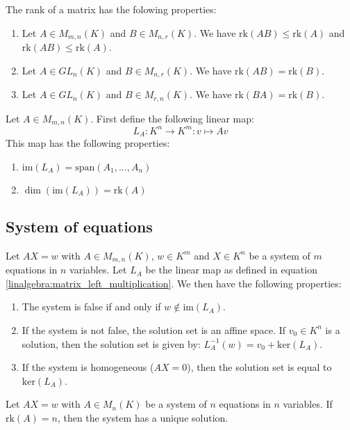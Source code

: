     \begin{property}
		\label{linalgebra:rank_properties}
        The rank of a matrix has the folowing properties:
        \begin{enumerate}
			\item Let $A\in M_{m,n}(K)$ and $B\in M_{n,r}(K)$. We have $\text{rk}(AB)\leq\text{rk}(A)$ and $\text{rk}(AB)\leq\text{rk}(A)$.
            \item Let $A\in GL_n(K)$ and $B\in M_{n,r}(K)$. We have $\text{rk}(AB)=\text{rk}(B)$.
            \item Let $A\in GL_n(K)$ and $B\in M_{r,n}(K)$. We have $\text{rk}(BA)=\text{rk}(B)$.
		\end{enumerate}
	\end{property}
    \begin{property}
		\label{linalgebra:dim_matrix_left_multiplication}
        Let $A\in M_{m,n}(K)$. First define the following linear map:
        \begin{equation}
			\label{linalgebra:matrix_left_multiplication}
            \boxed{L_A:K^n\rightarrow K^m:v\mapsto Av}
		\end{equation}
        This map has the following properties:
        \begin{enumerate}
        	\item $\text{im}(L_A) = \text{span}(A_1, ..., A_n)$
			\item $\dim(\text{im}(L_A))=\text{rk}(A)$
		\end{enumerate}
	\end{property}
    
\subsection{System of equations}
    \begin{theorem}
		\label{linalgebra:matrix_and_equations}
        Let $AX=w$ with $A\in M_{m,n}(K)$, $w\in K^m$ and $X\in K^n$ be a system of $m$ equations in $n$ variables. Let $L_A$ be the linear map as defined in equation \ref{linalgebra:matrix_left_multiplication}. We then have the following properties:
        \begin{enumerate}
			\item The system is false if and only if $w\not\in\text{im}(L_A)$.
            \item If the system is not false, the solution set is an affine space. If $v_0\in K^n$ is a solution, then the solution set is given by: $L_A^{-1}(w)=v_0+\text{ker}(L_A)$.
            \item If the system is homogeneous ($AX=0$), then the solution set is equal to $\text{ker}(L_A)$.
		\end{enumerate}
	\end{theorem}
    \begin{theorem}[Uniqueness]
		\label{linalgebra:rank_unique_solution}
        Let $AX=w$ with $A\in M_n(K)$ be a system of $n$ equations in $n$ variables. If $\text{rk}(A)=n$, then the system has a unique solution.
	\end{theorem}
    
